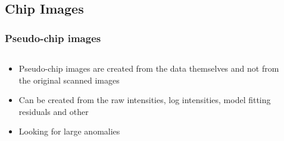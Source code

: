 \documentclass[pdf]{beamer}
\begin{document}
\subsection{Chip Images}
\begin{frame}
  \frametitle{Pseudo-chip images}
  \begin{columns}[t] %
    \begin{column}[T]{5cm} %
      \begin{itemize}
        \item Pseudo-chip images are created from the data themselves and not from the original scanned images
        \item Can be created from the raw intensities, log intensities, model fitting residuals and other
        \item Looking for large anomalies
      \end{itemize}
     \end{column}
     \begin{column}[T]{5cm} %

\end{column}
\end{columns}
\end{frame}
\end{document}
